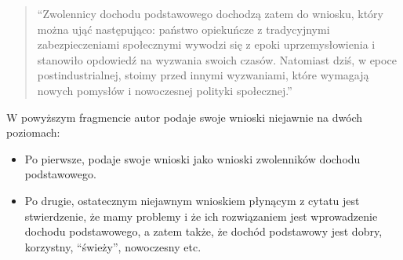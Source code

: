 \documentclass[11pt]{article}
\begin{document}
		\begin{quote}
			``Zwolennicy dochodu podstawowego dochodzą zatem do wniosku, który można ująć następująco: państwo opiekuńcze z tradycyjnymi zabezpieczeniami społecznymi wywodzi się z epoki uprzemysłowienia i stanowiło opdowiedź na wyzwania swoich czasów. Natomiast dziś, w epoce postindustrialnej, stoimy przed innymi wyzwaniami, które wymagają nowych pomysłów i nowoczesnej polityki społecznej.''
		\end{quote}
		\par W powyższym fragmencie autor podaje swoje wnioski niejawnie na dwóch poziomach:
		\begin{itemize}
			\item Po pierwsze, podaje swoje wnioski jako wnioski zwolenników dochodu podstawowego.
			\item Po drugie, ostatecznym niejawnym wnioskiem płynącym z cytatu jest stwierdzenie, że mamy problemy i że ich rozwiązaniem jest wprowadzenie dochodu podstawowego, a zatem także, że dochód podstawowy jest dobry, korzystny, ``świeży'', nowoczesny etc.
		\end{itemize}
	
\end{document}

